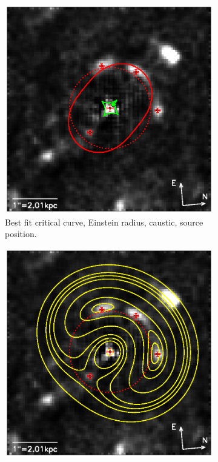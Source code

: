 \begin{figure}
\centering
\begin{subfigure}{.5\textwidth}
  \centering
  \includegraphics[width=.9\linewidth]{fig/lens_einstein.ps}
  \caption{Best fit critical curve, Einstein radius, caustic, source position.}
  \label{fig:lensbestfiteinsteincurves}
\end{subfigure}%
\begin{subfigure}{.5\textwidth}
  \centering
  \includegraphics[width=.9\linewidth]{fig/lens_timedelay.ps}

\end{subfigure}
\end{figure}
